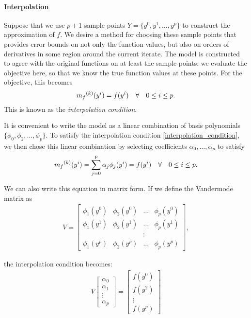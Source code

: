 \paragraph{Interpolation}
\label{interpolation}
Suppose that we use $p+1$ sample points $Y = \{y^0, y^1, \ldots, y^p\}$ to construct the approximation of $f$.
We desire a method for choosing these sample points that provides error bounds on not only the function values, but also on orders of derivatives in some region around the current iterate.
The model is constructed to agree with the original functions on at least the sample points: we evaluate the objective here, so that we know the true function values at these points.
For the objective, this becomes
\begin{align}
\label{interpolation_condition}
{{m}_f}^{(k)}(y^i) = f(y^i) \quad \forall \quad 0 \le i \le p.
\end{align}
This is known as the \emph{interpolation condition}.

It is convenient to write the model as a linear combination of basis polynomials $\{\phi_0, \phi_2, \ldots, \phi_p\}$.
To satisfy the interpolation condition \ref{interpolation_condition}, we then chose this linear combination by selecting coefficients $\alpha_0, \ldots, \alpha_p$ to satisfy
\[
    {{m}_f}^{(k)}(y^i) = \sum^p_{j=0}\alpha_j\phi_j(y^i) = f(y^i) \quad \forall \quad 0 \le i \le p.
\]

We can also write this equation in matrix form.
If we define the Vandermode matrix as
\begin{align}
\label{vandermonde}
V=
\begin{bmatrix}
    \phi_1(y^0)      & \phi_2(y^0)       & \ldots & \phi_{p}(y^0)      \\
    \phi_1(y^1)      & \phi_2(y^1)       & \dots  & \phi_{p}(y^1)      \\
                     &                   & \vdots &                    \\
    \phi_1(y^{p})    & \phi_2(y^{p})     & \ldots & \phi_{p}(y^{p})
\end{bmatrix},
\end{align}

the interpolation condition becomes:
\begin{align}
V
\begin{bmatrix}
    \alpha_0     \\
    \alpha_1     \\
    \vdots       \\
    \alpha_p
\end{bmatrix}
=
\begin{bmatrix}
    f(y^0)     \\
    f(y^2)     \\
    \vdots     \\
    f(y^p)
\end{bmatrix}
\end{align}

